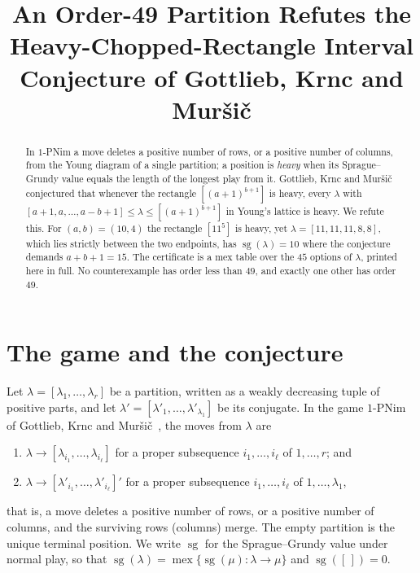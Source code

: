 \documentclass[11pt]{amsart}
\title[An order-49 counterexample to a heavy-interval conjecture]
{An Order-49 Partition Refutes the Heavy-Chopped-Rectangle
 Interval Conjecture of Gottlieb, Krnc and Mur\v{s}i\v{c}}
\date{}
\theoremstyle{definition}
\theoremstyle{remark}
\newcommand{\br}[1]{[#1]}
\newcommand{\sgv}{\operatorname{sg}}
\newcommand{\mex}{\operatorname{mex}}
\begin{document}
\begin{abstract}
In $1$-PNim a move deletes a positive number of rows, or a positive number of
columns, from the Young diagram of a single partition; a position is
\emph{heavy} when its Sprague--Grundy value equals the length of the longest
play from it. Gottlieb, Krnc and Mur\v{s}i\v{c} conjectured that whenever the
rectangle $\br{(a+1)^{b+1}}$ is heavy, every $\lambda$ with
$\br{a+1,a,\dots,a-b+1}\le\lambda\le\br{(a+1)^{b+1}}$ in Young's lattice is
heavy. We refute this. For $(a,b)=(10,4)$ the rectangle $\br{11^5}$ is heavy,
yet $\lambda=\br{11,11,11,8,8}$, which lies strictly between the two
endpoints, has $\sgv(\lambda)=10$ where the conjecture demands
$a+b+1=15$. The certificate is a mex table over the $45$ options of $\lambda$,
printed here in full. No counterexample has order less than $49$, and exactly
one other has order $49$.
\end{abstract}

\maketitle

\section{The game and the conjecture}

Let $\lambda=\br{\lambda_1,\dots,\lambda_r}$ be a partition, written as a
weakly decreasing tuple of positive parts, and let
$\lambda'=\br{\lambda'_1,\dots,\lambda'_{\lambda_1}}$ be its conjugate. In the
game $1$-PNim of Gottlieb, Krnc and Mur\v{s}i\v{c}~\cite{GKM}, the moves from
$\lambda$ are
\begin{enumerate}
\item[(1)] $\lambda\to\br{\lambda_{i_1},\dots,\lambda_{i_\ell}}$ for a proper
  subsequence $i_1,\dots,i_\ell$ of $1,\dots,r$; and
\item[(2)] $\lambda\to\br{\lambda'_{i_1},\dots,\lambda'_{i_\ell}}'$ for a
  proper subsequence $i_1,\dots,i_\ell$ of $1,\dots,\lambda_1$,
\end{enumerate}
that is, a move deletes a positive number of rows, or a positive number of
columns, and the surviving rows (columns) merge. The empty partition is the
unique terminal position. We write $\sgv$ for the Sprague--Grundy value under
normal play, so that $\sgv(\lambda)=\mex\{\sgv(\mu):\lambda\to\mu\}$ and
$\sgv(\br{\,})=0$.
\end{document}
